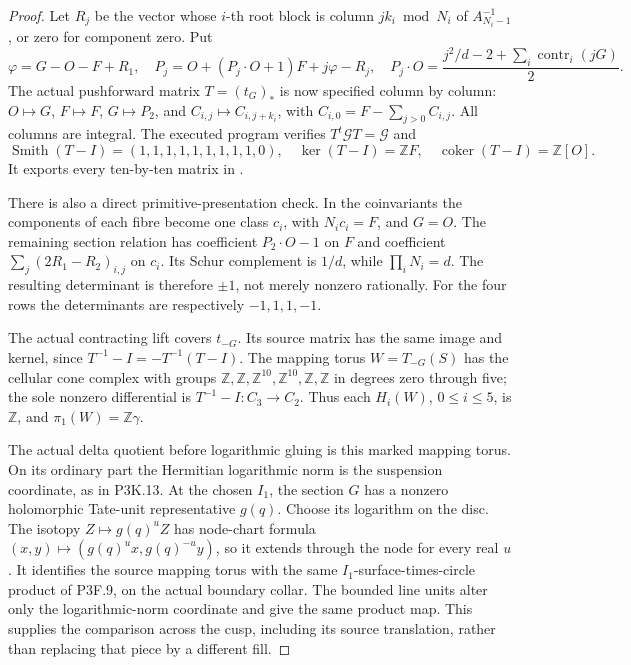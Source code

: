 \begin{proof}
Let \(R_j\) be the vector whose \(i\)-th root block is column
\(jk_i\bmod N_i\) of \(A_{N_i-1}^{-1}\), or zero for component
zero.  Put
\[
 \varphi=G-O-F+R_1,\quad
 P_j=O+(P_j\cdot O+1)F+j\varphi-R_j,
 \quad
 P_j\cdot O=\frac{j^2/d-2+\sum_i\operatorname{contr}_i(jG)}2.
\]
The actual pushforward matrix \(T=(t_G)_*\) is now specified
column by column: \(O\mapsto G\), \(F\mapsto F\),
\(G\mapsto P_2\), and
\(C_{i,j}\mapsto C_{i,j+k_i}\), with
\(C_{i,0}=F-\sum_{j>0}C_{i,j}\).  All columns are integral.
The executed program verifies \(T^t\mathcal G T=\mathcal G\) and
\[
 \operatorname{Smith}(T-I)=(1,1,1,1,1,1,1,1,1,0),
 \quad\ker(T-I)=\mathbb ZF,
 \quad\operatorname{coker}(T-I)=\mathbb Z[O].             \tag{P3K.22.4}
\]
It exports every ten-by-ten matrix in
.

There is also a direct primitive-presentation check.  In the
coinvariants the components of each fibre become one class \(c_i\),
with \(N_i c_i=F\), and \(G=O\).  The remaining section relation
has coefficient \(P_2\cdot O-1\) on \(F\) and coefficient
\(\sum_j(2R_1-R_2)_{i,j}\) on \(c_i\).  Its Schur complement is
\(1/d\), while \(\prod_iN_i=d\).  The resulting determinant is
therefore \(\pm1\), not merely nonzero rationally.  For the four
rows the determinants are respectively \(-1,1,1,-1\).

The actual contracting lift covers \(t_{-G}\).  Its source matrix
has the same image and kernel, since
\(T^{-1}-I=-T^{-1}(T-I)\).  The mapping torus
\(W=T_{-G}(S)\) has the cellular cone complex with groups
\(\mathbb Z,\mathbb Z,\mathbb Z^{10},\mathbb Z^{10},
\mathbb Z,\mathbb Z\) in degrees zero through five; the sole
nonzero differential is \(T^{-1}-I:C_3\to C_2\).
Thus each \(H_i(W)\), \(0\le i\le5\), is \(\mathbb Z\),
and \(\pi_1(W)=\mathbb Z\gamma\).

The actual delta quotient before logarithmic gluing is this marked
mapping torus.  On its ordinary part the Hermitian logarithmic norm
is the suspension coordinate, as in P3K.13.  At the chosen \(I_1\),
the section \(G\) has a nonzero holomorphic Tate-unit representative
\(g(q)\).  Choose its logarithm on the disc.  The isotopy
\(Z\mapsto g(q)^u Z\) has node-chart formula
\((x,y)\mapsto(g(q)^u x,g(q)^{-u}y)\), so it extends through the
node for every real \(u\).  It identifies the source mapping torus
with the same \(I_1\)-surface-times-circle product of P3F.9, on
the actual boundary collar.  The bounded line units alter only the
logarithmic-norm coordinate and give the same product map.  This
supplies the comparison across the cusp, including its source
translation, rather than replacing that piece by a different fill.


\end{proof}
